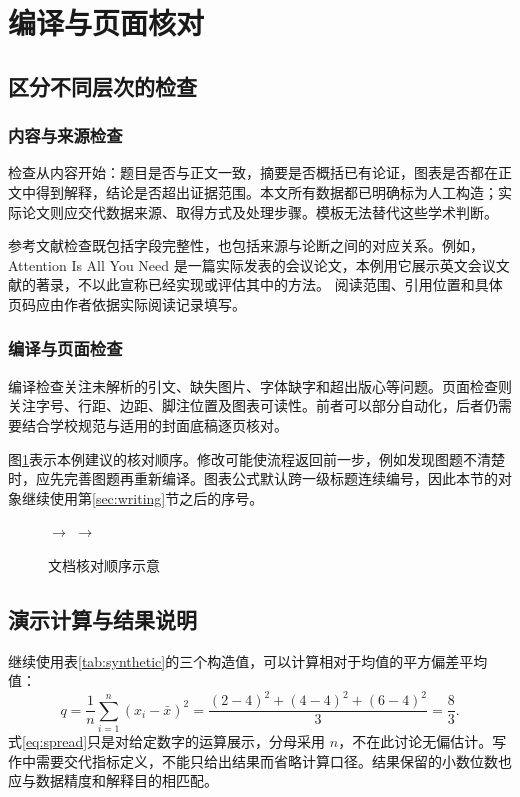 \section{编译与页面核对}
\label{sec:validation}

\subsection{区分不同层次的检查}
\subsubsection{内容与来源检查}
检查从内容开始：题目是否与正文一致，摘要是否概括已有论证，图表是否都在正文中得到解释，结论是否超出证据范围。本文所有数据都已明确标为人工构造；实际论文则应交代数据来源、取得方式及处理步骤。模板无法替代这些学术判断。

参考文献检查既包括字段完整性，也包括来源与论断之间的对应关系。例如，Attention Is All You Need 是一篇实际发表的会议论文，本例用它展示英文会议文献的著录，不以此宣称已经实现或评估其中的方法。 阅读范围、引用位置和具体页码应由作者依据实际阅读记录填写。

\subsubsection{编译与页面检查}
编译检查关注未解析的引文、缺失图片、字体缺字和超出版心等问题。页面检查则关注字号、行距、边距、脚注位置及图表可读性。前者可以部分自动化，后者仍需要结合学校规范与适用的封面底稿逐页核对。

图\ref{fig:review}表示本例建议的核对顺序。修改可能使流程返回前一步，例如发现图题不清楚时，应先完善图题再重新编译。图表公式默认跨一级标题连续编号，因此本节的对象继续使用第\ref{sec:writing}节之后的序号。
\begin{figure}[htbp]
  \centering
  \setlength{\fboxsep}{7pt}
  \enspace$\longrightarrow$\enspace
  \enspace$\longrightarrow$\enspace
  \caption{文档核对顺序示意}
  \label{fig:review}
\end{figure}

\subsection{演示计算与结果说明}
继续使用表\ref{tab:synthetic}的三个构造值，可以计算相对于均值的平方偏差平均值：
\begin{equation}
  q=\frac{1}{n}\sum_{i=1}^{n}(x_i-\bar{x})^2
    =\frac{(2-4)^2+(4-4)^2+(6-4)^2}{3}=\frac{8}{3}.
  \label{eq:spread}
\end{equation}
式\eqref{eq:spread}只是对给定数字的运算展示，分母采用 $n$，不在此讨论无偏估计。写作中需要交代指标定义，不能只给出结果而省略计算口径。结果保留的小数位数也应与数据精度和解释目的相匹配。

